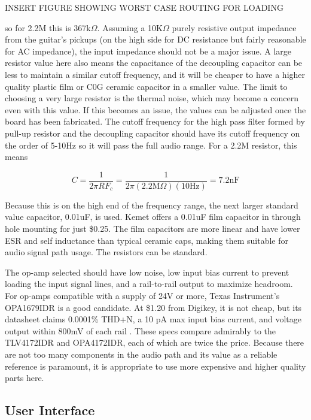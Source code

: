 \documentclass{article}
\begin{document}
	INSERT FIGURE SHOWING WORST CASE ROUTING FOR LOADING

	so for 2.2M this is 367k$\Omega$.  Assuming a 10K$\Omega$ purely resistive output impedance from the guitar's pickups (on the high side for DC resistance but fairly reasonable for AC impedance), the input impedance should not be a major issue.  A large resistor value here also means the capacitance of the decoupling capacitor can be less to maintain a similar cutoff frequency, and it will be cheaper to have a higher quality plastic film or C0G ceramic capacitor in a smaller value.  The limit to choosing a very large resistor is the thermal noise, which may become a concern even with this value.  If this becomes an issue, the values can be adjusted once the board has been fabricated.  The cutoff frequency for the high pass filter formed by pull-up resistor and the decoupling capacitor should have its cutoff frequency on the order of 5-10Hz so it will pass the full audio range.  For a 2.2M resistor, this means

	$$ C = \frac{1}{2\pi R F_c} = \frac{1}{2\pi (2.2 \text{M}\Omega) (10 \text{Hz})} = 7.2 \text{nF}$$

	Because this is on the high end of the frequency range, the next larger standard value capacitor, 0.01uF, is used.  Kemet offers a 0.01uF film capacitor in through hole mounting for just \$0.25.  The film capacitors are more linear and have lower ESR and self inductance than typical ceramic caps, making them suitable for audio signal path usage.  The resistors can be standard.

	The op-amp selected should have low noise, low input bias current to prevent loading the input signal lines, and a rail-to-rail output to maximize headroom.  For op-amps compatible with a supply of 24V or more, Texas Instrument's OPA1679IDR is a good candidate.  At \$1.20 from Digikey, it is not cheap, but its datasheet claims 0.0001\% THD+N, a 10 pA max input bias current, and voltage output within 800mV of each rail \cite{datasheet:OPA1679IDR}.  These specs compare admirably to the TLV4172IDR and OPA4172IDR, each of which are twice the price.  Because there are not too many components in the audio path and its value as a reliable reference is paramount, it is appropriate to use more expensive and higher quality parts here.

	\subsection{User Interface}
\end{document}
